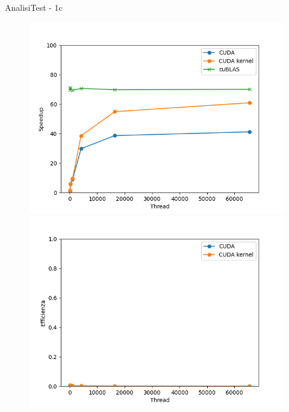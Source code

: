 \begin{frame}{Analisi}{Test - 1c}
    \begin{figure}[H]
        \centering
        \begin{minipage}{0.49\textwidth}
            \includegraphics[width=\textwidth]{./imgs/graphs/caso_a2_speedup.png}
        \end{minipage}
        \begin{minipage}{0.49\textwidth}
            \includegraphics[width=\textwidth]{./imgs/graphs/caso_a2_efficiency.png}
        \end{minipage}
    \end{figure}
\end{frame}

